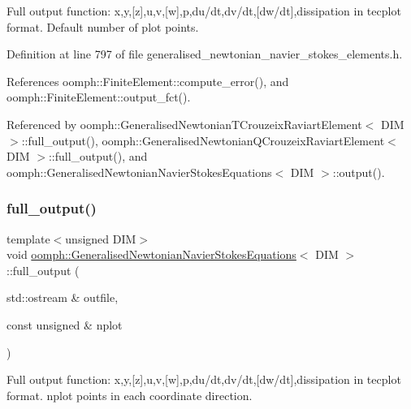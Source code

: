 Full output function\+: x,y,\mbox{[}z\mbox{]},u,v,\mbox{[}w\mbox{]},p,du/dt,dv/dt,\mbox{[}dw/dt\mbox{]},dissipation in tecplot format. Default number of plot points. 



Definition at line 797 of file generalised\+\_\+newtonian\+\_\+navier\+\_\+stokes\+\_\+elements.\+h.



References oomph\+::\+Finite\+Element\+::compute\+\_\+error(), and oomph\+::\+Finite\+Element\+::output\+\_\+fct().



Referenced by oomph\+::\+Generalised\+Newtonian\+T\+Crouzeix\+Raviart\+Element$<$ D\+I\+M $>$\+::full\+\_\+output(), oomph\+::\+Generalised\+Newtonian\+Q\+Crouzeix\+Raviart\+Element$<$ D\+I\+M $>$\+::full\+\_\+output(), and oomph\+::\+Generalised\+Newtonian\+Navier\+Stokes\+Equations$<$ D\+I\+M $>$\+::output().

\mbox{\label{classoomph_1_1GeneralisedNewtonianNavierStokesEquations_a968a3921356d13d0e9be79a74fca032f}} 
\subsubsection{\texorpdfstring{full\+\_\+output()}{full\_output()}\hspace{0.1cm}{\footnotesize\ttfamily [2/2]}}
{\footnotesize\ttfamily template$<$unsigned D\+IM$>$ \\
void \hyperlink{classoomph_1_1GeneralisedNewtonianNavierStokesEquations}{oomph\+::\+Generalised\+Newtonian\+Navier\+Stokes\+Equations}$<$ D\+IM $>$\+::full\+\_\+output (\begin{DoxyParamCaption}\item[{std\+::ostream \&}]{outfile,  }\item[{const unsigned \&}]{nplot }\end{DoxyParamCaption})}



Full output function\+: x,y,\mbox{[}z\mbox{]},u,v,\mbox{[}w\mbox{]},p,du/dt,dv/dt,\mbox{[}dw/dt\mbox{]},dissipation in tecplot format. nplot points in each coordinate direction. 

